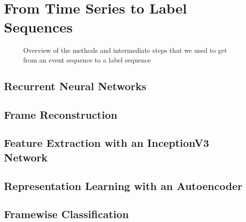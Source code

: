 \chapter{From Time Series to Label Sequences}
\label{cha:methods}

\begin{figure}[h]
  \caption{Overview of the methods and intermediate steps that we used to get
    from an event sequence to a label sequence}
  \label{fig:method-overview}
\end{figure}

\section{Recurrent Neural Networks}
\label{sec:rnns}

\section{Frame Reconstruction}
\label{sec:frame-reconstruction}

\section{Feature Extraction with an InceptionV3 Network}
\label{sec:inceptionv3}

\section{Representation Learning with an Autoencoder}
\label{sec:autoencoder}

\section{Framewise Classification}
\label{sec:framewise}

